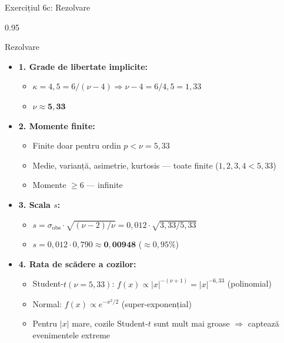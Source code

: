 \documentclass[9pt, aspectratio=169, t]{beamer}
\begin{document}
\begin{frame}[shrink=25]{Exercițiul 6c: Rezolvare}
\begin{cminipage}{0.95\textwidth}
\begin{exampleblock}{Rezolvare}
\begin{itemize}\setlength{\itemsep}{0pt}
    \item \textbf{1. Grade de libertate implicite:}
    \begin{itemize}\setlength{\itemsep}{0pt}
        \item $\kappa = 4{,}5 = 6/(\nu - 4) \Rightarrow \nu - 4 = 6/4{,}5 = 1{,}33$
        \item $\nu \approx \mathbf{5{,}33}$
    \end{itemize}
    \item \textbf{2. Momente finite:}
    \begin{itemize}\setlength{\itemsep}{0pt}
        \item Finite doar pentru ordin $p < \nu = 5{,}33$
        \item Medie, varianță, asimetrie, kurtosis --- toate finite ($1, 2, 3, 4 < 5{,}33$)
        \item Momente $\ge 6$ --- infinite
    \end{itemize}
    \item \textbf{3. Scala $s$:}
    \begin{itemize}\setlength{\itemsep}{0pt}
        \item $s = \sigma_{\text{obs}} \cdot \sqrt{(\nu - 2)/\nu} = 0{,}012 \cdot \sqrt{3{,}33/5{,}33}$
        \item $s = 0{,}012 \cdot 0{,}790 \approx \mathbf{0{,}00948}$ ($\approx 0{,}95\%$)
    \end{itemize}
    \item \textbf{4. Rata de scădere a cozilor:}
    \begin{itemize}\setlength{\itemsep}{0pt}
        \item Student-$t(\nu = 5{,}33)$: $f(x) \propto |x|^{-(\nu+1)} = |x|^{-6{,}33}$ (polinomial)
        \item Normal: $f(x) \propto e^{-x^2/2}$ (super-exponențial)
        \item Pentru $|x|$ mare, cozile Student-$t$ sunt mult mai groase $\Rightarrow$ captează evenimentele extreme
    \end{itemize}
\end{itemize}
\end{exampleblock}
\end{cminipage}
\end{frame}
\end{document}

